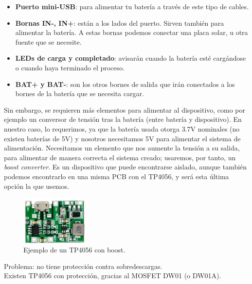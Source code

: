 \documentclass[12pt]{article}
\begin{document}
	\begin{itemize}
		\item \textbf{Puerto mini-USB}: para alimentar tu batería a través de este tipo de cables. 
		\item \textbf{Bornas IN-, IN+}: están a los lados del puerto. Sirven también para alimentar la batería. A estas bornas podemos conectar una placa solar, u otra fuente que se necesite.
		\item \textbf{LEDs de carga y completado}: avisarán cuando la batería esté cargándose o cuando haya terminado el proceso.
		\item \textbf{BAT+ y BAT-}: son los otros bornes de salida que irán conectados a los bornes de la batería que se necesita cargar.
	\end{itemize}

	\noindent Sin embargo, se requieren más elementos para alimentar al dispositivo, como por ejemplo un conversor de tensión tras la batería (entre batería y dispositivo). En nuestro caso, lo requerimos, ya que la batería usada otorga 3.7V nominales (no existen baterías de 5V) y nosotros necesitamos 5V para alimentar el sistema de alimentación. Necesitamos un elemento que nos aumente la tensión a su salida, para alimentar de manera correcta el sistema creado; usaremos, por tanto, un \textit{boost converter}. Es un dispositivo que puede encontrarse aislado, aunque también podemos encontrarlo en una misma PCB con el TP4056, y será esta última opción la que usemos. \\
	
	\begin{figure}[h]
		\begin{center}
			\includegraphics[width=0.3\textwidth]{img/tp4056_withBoost.png}
			\caption{Ejemplo de un TP4056 con boost.}
			\label{TP4056 con boost}
		\end{center}
	\end{figure}
	
	\noindent Problema: no tiene protección contra sobredescargas. \\
	
	\noindent Existen TP4056 con protección, gracias al MOSFET DW01 (o DW01A). \\
	
\end{document}
